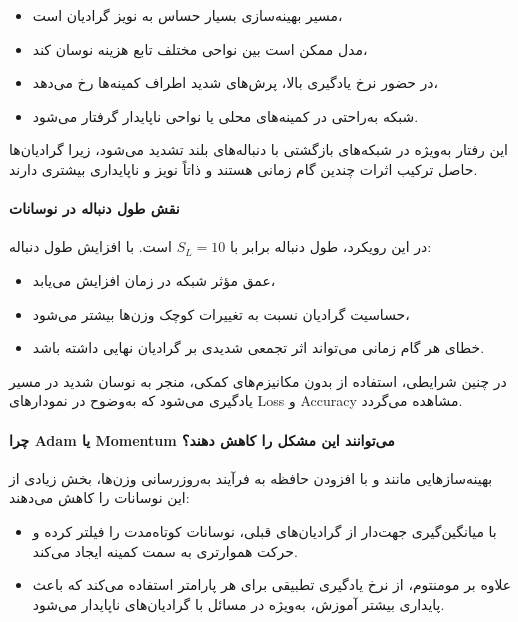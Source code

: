 \documentclass{article}
\begin{document}
\begin{itemize}
	\item مسیر بهینه‌سازی بسیار حساس به نویز گرادیان است،
	\item مدل ممکن است بین نواحی مختلف تابع هزینه نوسان کند،
	\item در حضور نرخ یادگیری بالا، پرش‌های شدید اطراف کمینه‌ها رخ می‌دهد،
	\item شبکه به‌راحتی در کمینه‌های محلی یا نواحی ناپایدار گرفتار می‌شود.
\end{itemize}

این رفتار به‌ویژه در شبکه‌های بازگشتی با دنباله‌های بلند تشدید می‌شود، زیرا گرادیان‌ها حاصل ترکیب اثرات چندین گام زمانی هستند و ذاتاً نویز و ناپایداری بیشتری دارند.

\paragraph{نقش طول دنباله در نوسانات}
در این رویکرد، طول دنباله برابر با $S_L=10$ است. با افزایش طول دنباله:

\begin{itemize}
	\item عمق مؤثر شبکه در زمان افزایش می‌یابد،
	\item حساسیت گرادیان نسبت به تغییرات کوچک وزن‌ها بیشتر می‌شود،
	\item خطای هر گام زمانی می‌تواند اثر تجمعی شدیدی بر گرادیان نهایی داشته باشد.
\end{itemize}

در چنین شرایطی، استفاده از  بدون مکانیزم‌های کمکی، منجر به نوسان شدید در مسیر یادگیری می‌شود که به‌وضوح در نمودارهای Loss و Accuracy مشاهده می‌گردد.

\paragraph{چرا Adam یا Momentum می‌توانند این مشکل را کاهش دهند؟}
بهینه‌سازهایی مانند  و  با افزودن حافظه به فرآیند به‌روزرسانی وزن‌ها، بخش زیادی از این نوسانات را کاهش می‌دهند:

\begin{itemize}
	\item {} با میانگین‌گیری جهت‌دار از گرادیان‌های قبلی، نوسانات کوتاه‌مدت را فیلتر کرده و حرکت هموارتری به سمت کمینه ایجاد می‌کند.
	\item {} علاوه بر مومنتوم، از نرخ یادگیری تطبیقی برای هر پارامتر استفاده می‌کند که باعث پایداری بیشتر آموزش، به‌ویژه در مسائل با گرادیان‌های ناپایدار می‌شود.
\end{itemize}
\end{document}
